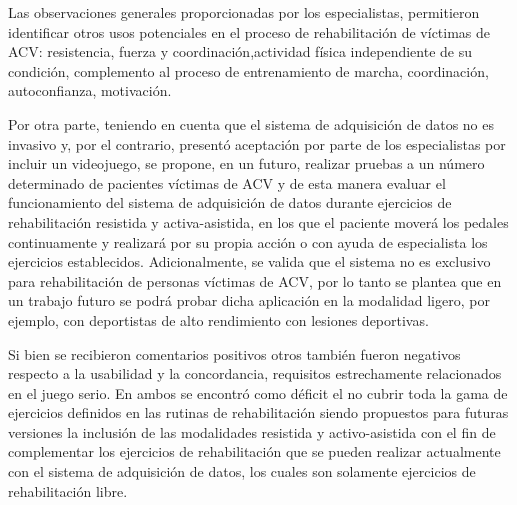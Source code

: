 Las observaciones generales proporcionadas por los especialistas, permitieron identificar otros usos potenciales en el proceso de rehabilitación de víctimas de ACV: resistencia, fuerza y coordinación,actividad física independiente de su condición, complemento al proceso de entrenamiento de marcha, coordinación, autoconfianza, motivación.

Por otra parte, teniendo en cuenta que el sistema de adquisición de datos no es invasivo y, por el contrario, presentó aceptación por parte de los especialistas por incluir un videojuego, se propone, en un futuro, realizar pruebas a un número determinado de pacientes víctimas de ACV y de esta manera evaluar el funcionamiento del sistema de adquisición de datos durante ejercicios de rehabilitación resistida y activa-asistida, en los que el paciente moverá los pedales continuamente y realizará por su propia acción o con ayuda de especialista los ejercicios establecidos. Adicionalmente, se valida que el sistema no es exclusivo para rehabilitación de personas víctimas de ACV, por lo tanto se plantea que en un trabajo futuro se podrá probar dicha aplicación en la modalidad ligero, por ejemplo, con deportistas de alto rendimiento con lesiones deportivas.

Si bien se recibieron comentarios  positivos otros también fueron negativos respecto a la usabilidad y la concordancia, requisitos estrechamente relacionados en el juego serio. En ambos se encontró como déficit el no cubrir toda la gama de ejercicios definidos en las rutinas de rehabilitación siendo propuestos para futuras versiones la inclusión de las modalidades resistida y activo-asistida con el fin de complementar los ejercicios de rehabilitación que se pueden realizar actualmente con el sistema de adquisición de datos, los cuales son solamente ejercicios de rehabilitación libre.
